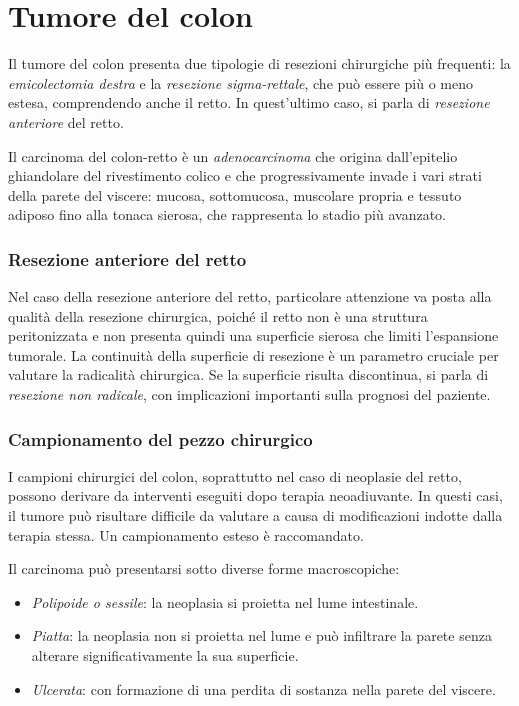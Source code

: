 \section{Tumore del colon}
Il tumore del colon presenta due tipologie di resezioni chirurgiche più frequenti: la \textit{emicolectomia destra} e la \textit{resezione sigma-rettale}, che può essere più o meno estesa, comprendendo anche il retto. In quest'ultimo caso, si parla di \textit{resezione anteriore} del retto.

Il carcinoma del colon-retto è un \textit{adenocarcinoma} che origina dall'epitelio ghiandolare del rivestimento colico e che progressivamente invade i vari strati della parete del viscere: mucosa, sottomucosa, muscolare propria e tessuto adiposo fino alla tonaca sierosa, che rappresenta lo stadio più avanzato.

\subsubsection{Resezione anteriore del retto}
Nel caso della resezione anteriore del retto, particolare attenzione va posta alla qualità della resezione chirurgica, poiché il retto non è una struttura peritonizzata e non presenta quindi una superficie sierosa che limiti l'espansione tumorale. La continuità della superficie di resezione è un parametro cruciale per valutare la radicalità chirurgica. Se la superficie risulta discontinua, si parla di \textit{resezione non radicale}, con implicazioni importanti sulla prognosi del paziente.

\subsubsection{Campionamento del pezzo chirurgico}
I campioni chirurgici del colon, soprattutto nel caso di neoplasie del retto, possono derivare da interventi eseguiti dopo terapia neoadiuvante. In questi casi, il tumore può risultare difficile da valutare a causa di modificazioni indotte dalla terapia stessa. Un campionamento esteso è raccomandato. 

Il carcinoma può presentarsi sotto diverse forme macroscopiche:
\begin{itemize}
    \item \textit{Polipoide o sessile}: la neoplasia si proietta nel lume intestinale.
    \item \textit{Piatta}: la neoplasia non si proietta nel lume e può infiltrare la parete senza alterare significativamente la sua superficie.
    \item \textit{Ulcerata}: con formazione di una perdita di sostanza nella parete del viscere.
\end{itemize}

